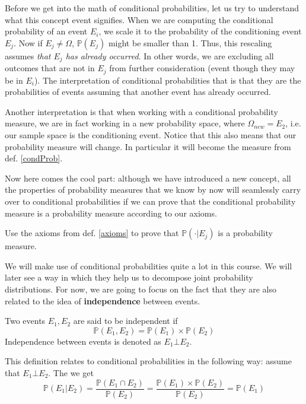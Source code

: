 \documentclass[a4paper,11pt,leqno]{report}
\begin{document}
Before we get into the math of conditional probabilities, let us try to understand what this concept event
signifies. When we are computing the conditional probability of an event $ E_{i} $, we scale it to the 
probability of the conditioning event $ E_{j} $. Now if $ E_{j} \not = \Omega $, $ \mathbb{P}(E_{j}) $
might be smaller than 1. Thus, this rescaling assumes \textit{that $ E_{j} $ has already occurred}. In other
words, we are excluding all outcomes that are not in $ E_{j} $ from further consideration (event though they
may be in $ E_{i} $). The interpretation of conditional probabilities that is that they are the probabilities
of events assuming that another event has already occurred.

Another interpretation is that when working with a conditional probability measure, we are in fact working
in a new probability space, where $ \Omega_{new} = E_{2} $, i.e. our sample space is the conditioning event.
Notice that this also means that our probability measure will change. In particular it will become the
measure from def. \ref{condProb}.

Now here comes the cool part: although we have introduced a new concept, all the properties of probability
measures that we know by now will seamlessly carry over to conditional probabilities if we can prove
that the conditional probability measure is a probability measure according to our axioms.

\begin{Exercise}
Use the axioms from def. \ref{axioms} to prove that $ \mathbb{P}(\cdot|E_{j}) $ is a probability measure.
\end{Exercise} 

We will make use of conditional probabilities quite a lot in this course. We will later see a way in which
they help us to decompose joint probability distributions. For now, we are going to focus on the fact that
they are also related to the idea of \textbf{independence} between events.

\begin{Definition}
Two events $ E_{1}, E_{2} $ are said to be independent if 
$$ \mathbb{P}(E_{1}, E_{2}) = \mathbb{P}(E_{1}) \times \mathbb{P}(E_{2}) $$
Independence between events is denoted as $ E_{1} \bot E_{2} $.
\end{Definition}

This definition relates to conditional probabilities in the following way: assume that $ E_{1} \bot E_{2} $.
The we get
\begin{equation}
\mathbb{P}(E_{1}|E_{2}) = \dfrac{\mathbb{P}(E_{1} \cap E_{2})}{\mathbb{P}(E_{2})}
= \dfrac{\mathbb{P}(E_{1}) \times \mathbb{P}(E_{2})}{\mathbb{P}(E_{2})} = \mathbb{P}(E_{1})
\end{equation}
\end{document}
